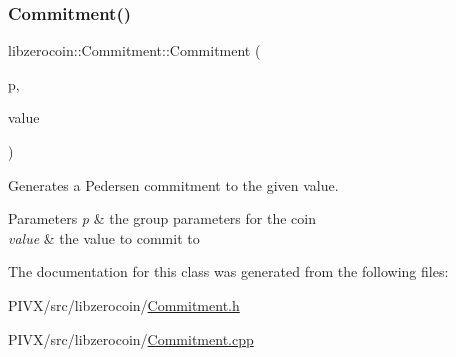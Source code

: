 \subsubsection{\texorpdfstring{Commitment()}{Commitment()}}
{\footnotesize\ttfamily libzerocoin\+::\+Commitment\+::\+Commitment (\begin{DoxyParamCaption}\item[{const \mbox{\hyperlink{classlibzerocoin_1_1_integer_group_params}{Integer\+Group\+Params}} $\ast$}]{p,  }\item[{const \mbox{\hyperlink{class_c_big_num}{C\+Big\+Num}} \&}]{value }\end{DoxyParamCaption})}

Generates a Pedersen commitment to the given value.


\begin{DoxyParams}{Parameters}
{\em p} & the group parameters for the coin \\
\hline
{\em value} & the value to commit to \\
\hline
\end{DoxyParams}


The documentation for this class was generated from the following files\+:\begin{DoxyCompactItemize}
\item 
P\+I\+V\+X/src/libzerocoin/\mbox{\hyperlink{_commitment_8h}{Commitment.\+h}}\item 
P\+I\+V\+X/src/libzerocoin/\mbox{\hyperlink{_commitment_8cpp}{Commitment.\+cpp}}\end{DoxyCompactItemize}
